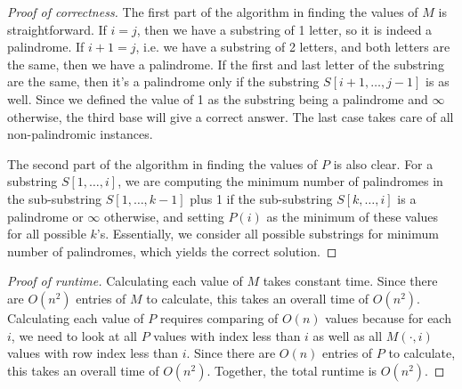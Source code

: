 \documentclass{article}
\begin{document}
\begin{proof}[Proof of correctness]
The first part of the algorithm in finding the values of $M$ is straightforward. If $i=j$, then we have a substring of 1 letter, so it is indeed a palindrome. If $i+1=j$, i.e. we have a substring of 2 letters, and both letters are the same, then we have a palindrome. If the first and last letter of the substring are the same, then it's a palindrome only if the substring $S[i+1,\dots, j-1]$ is as well. Since we defined the value of 1 as the substring being a palindrome and $\infty$ otherwise, the third base will give a correct answer. The last case takes care of all non-palindromic instances.

The second part of the algorithm in finding the values of $P$ is also clear. For a substring $S[1,\dots,i]$, we are computing the minimum number of palindromes in the sub-substring $S[1,\dots,k-1]$ plus 1 if the sub-substring $S[k,\dots,i]$ is a palindrome or $\infty$ otherwise, and setting $P(i)$ as the minimum of these values for all possible $k$'s. Essentially, we consider all possible substrings for minimum number of palindromes, which yields the correct solution.
\end{proof}

\begin{proof}[Proof of runtime]
Calculating each value of $M$ takes constant time. Since there are $O(n^2)$ entries of $M$ to calculate, this takes an overall time of $O(n^2)$. Calculating each value of $P$ requires comparing of $O(n)$ values because for each $i$, we need to look at all $P$ values with index less than $i$ as well as all $M(\cdot, i)$ values with row index less than $i$. Since there are $O(n)$ entries of $P$ to calculate, this takes an overall time of $O(n^2)$. Together, the total runtime is $O(n^2)$.
\end{proof}


\pagebreak
\end{document}
